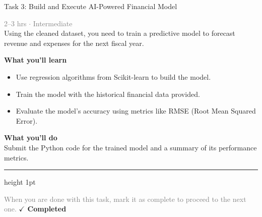 \documentclass[10pt,a4paper]{article}
\begin{document}
\begin{taskbox}{Task 3: Build and Execute AI-Powered Financial Model}

    {\small \textcolor{gray}{2--3 hrs $\cdot$ Intermediate}}\\[12pt]

      
Using the cleaned dataset, you need to train a predictive model to forecast revenue and expenses for the next fiscal year.  


\vspace{8pt}
{\large \textbf{\textcolor{brandLight}{What you'll learn}}}\\[4pt]  
\begin{itemize}
    \item Use regression algorithms from Scikit-learn to build the model.  
    \item Train the model with the historical financial data provided.  
    \item Evaluate the model’s accuracy using metrics like RMSE (Root Mean Squared Error).  
\end{itemize}

\vspace{8pt}
{\large \textbf{\textcolor{brandLight}{What you'll do}}}\\[4pt]  
Submit the Python code for the trained model and a summary of its performance metrics.\par

    \vspace{16pt}

    \textcolor{cardBorder}{\hrule height 1pt}\vspace{8pt}

    \small \textcolor{gray}{When you are done with this task, mark it as complete to proceed to the next one.} \hfill \textbf{\textcolor{brandDark}{$\checkmark$ Completed}}

\end{taskbox}
\end{document}

